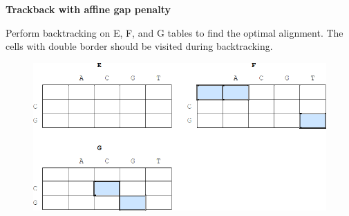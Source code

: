 \question \textbf{Trackback with affine gap penalty}
  
Perform backtracking on E, F, and G tables to find the optimal alignment. The cells with double border should be visited during backtracking. 

\medskip 

\begin{figure}[h]
  \centering
      \includegraphics[width=0.75 \textwidth]{fig03/affine_dp_backtrack.png}
\end{figure}

\vspace{0.1 in}


\newpage

